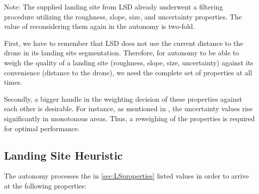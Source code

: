 Note: The supplied landing site from LSD already underwent a filtering procedure utilizing the roughness, slope, size, and uncertainty properties. The value of reconsidering them again in the autonomy is two-fold.

First, we have to remember that LSD does not use the current distance to the drone in its landing site segmentation. Therefore, for autonomy to be able to weigh the quality of a landing site (roughness, slope, size, uncertainty) against its convenience (distance to the drone), we need the complete set of properties at all times.

Secondly, a bigger handle in the weighting decision of these properties against each other is desirable. For instance, as mentioned in \citet{LSD2}, the uncertainty values rise significantly in monotonous areas. Thus, a reweighing of the properties is required for optimal performance.

\clearpage %

\subsection{Landing Site Heuristic}\label{subsec:heuristics}

The autonomy processes the in \cref{sec:LSproperties} listed values in order to arrive at the following properties:

